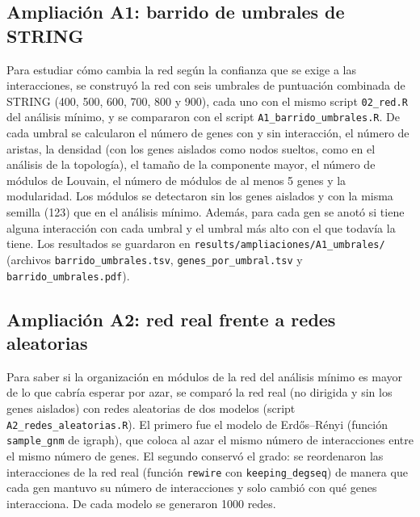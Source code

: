 \subsection{Ampliación A1: barrido de umbrales de STRING}

Para estudiar cómo cambia la red según la confianza que se exige a las interacciones, se construyó la red con seis umbrales de puntuación combinada de STRING (400, 500, 600, 700, 800 y 900), cada uno con el mismo script \texttt{02\_red.R} del análisis mínimo, y se compararon con el script \texttt{A1\_barrido\_umbrales.R}. De cada umbral se calcularon el número de genes con y sin interacción, el número de aristas, la densidad (con los genes aislados como nodos sueltos, como en el análisis de la topología), el tamaño de la componente mayor, el número de módulos de Louvain, el número de módulos de al menos 5 genes y la modularidad. Los módulos se detectaron sin los genes aislados y con la misma semilla (123) que en el análisis mínimo. Además, para cada gen se anotó si tiene alguna interacción con cada umbral y el umbral más alto con el que todavía la tiene. Los resultados se guardaron en \texttt{results/ampliaciones/A1\_umbrales/} (archivos \texttt{barrido\_umbrales.tsv}, \texttt{genes\_por\_umbral.tsv} y \texttt{barrido\_umbrales.pdf}).

\subsection{Ampliación A2: red real frente a redes aleatorias}

Para saber si la organización en módulos de la red del análisis mínimo es mayor de lo que cabría esperar por azar, se comparó la red real (no dirigida y sin los genes aislados) con redes aleatorias de dos modelos (script \texttt{A2\_redes\_aleatorias.R}). El primero fue el modelo de Erd\H{o}s--R\'enyi (función \texttt{sample\_gnm} de igraph), que coloca al azar el mismo número de interacciones entre el mismo número de genes. El segundo conservó el grado: se reordenaron las interacciones de la red real (función \texttt{rewire} con \texttt{keeping\_degseq}) de manera que cada gen mantuvo su número de interacciones y solo cambió con qué genes interacciona. De cada modelo se generaron 1000 redes.

